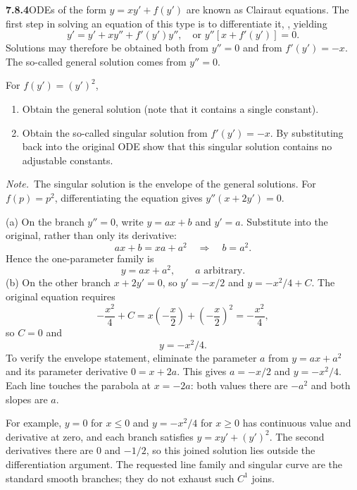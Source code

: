 \par\bigskip
\noindent\textbf{7.8.4}\quad ODEs of the form $y=xy'+f(y')$ are known as
Clairaut equations. The first step in solving an equation of this type is to
differentiate it, , yielding
\[
y'=y'+xy''+f'(y')y'',\quad\text{or }y''\left[x+f'(y')\right]=0.
\]
Solutions may therefore be obtained both from $y''=0$ and from
$f'(y')=-x$. The so-called general solution comes from $y''=0$.

For $f(y')=(y')^{2}$,
\begin{enumerate}
\item[(a)] Obtain the general solution (note that it contains a single
  constant).
\item[(b)] Obtain the so-called singular solution from $f'(y')=-x$. By
  substituting back into the original ODE show that this singular solution
  contains no adjustable constants.
\end{enumerate}
\emph{Note.}~The singular solution is the envelope of the general solutions.
\solution
For $f(p)=p^2$, differentiating the equation gives
$y''(x+2y')=0$.

(a) On the branch $y''=0$, write $y=ax+b$ and $y'=a$.
Substitute into the original, rather than only its derivative:
\[
ax+b=xa+a^2\quad\Longrightarrow\quad b=a^2.
\]
Hence the one-parameter family is
\[
\boxed{y=ax+a^2},\qquad a\text{ arbitrary}.
\]
(b) On the other branch $x+2y'=0$, so $y'=-x/2$ and
$y=-x^2/4+C$. The original equation requires
\[
-\frac{x^2}4+C=x\left(-\frac x2\right)+\left(-\frac x2\right)^2
=-\frac{x^2}4,
\]
so $C=0$ and
\[
\boxed{y=-x^2/4}.
\]
To verify the envelope statement, eliminate the parameter $a$ from
$y=ax+a^2$ and its parameter derivative $0=x+2a$.
This gives $a=-x/2$ and $y=-x^2/4$. Each line touches the parabola
at $x=-2a$: both values there are $-a^2$ and both slopes are $a$.

For example, $y=0$ for $x\le0$ and $y=-x^2/4$ for $x\ge0$ has
continuous value and derivative at zero, and each branch satisfies
$y=xy'+(y')^2$. The second derivatives there are $0$ and $-1/2$,
so this joined solution lies outside the differentiation argument.
The requested line family and singular curve are the standard smooth
branches; they do not exhaust such $C^1$ joins.
